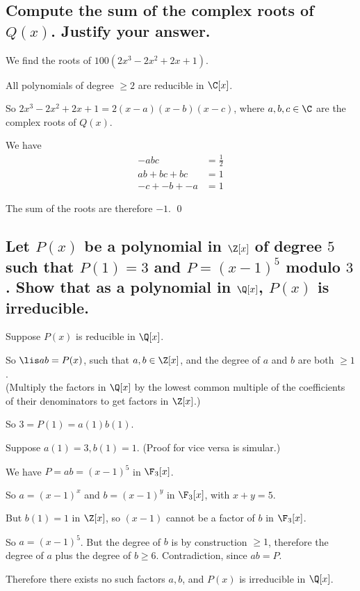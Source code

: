     \subsection[(ii)]{
        Compute the sum of the complex roots of $Q(x)$. Justify your answer.
    }
        We find the roots of $100(2x^3 - 2x^2 + 2x + 1)$.

        All polynomials of degree $\geq 2$ are reducible in $\C[x]$.

        So $2x^3 - 2x^2 + 2x + 1 = 2(x - a)(x-b) ( x-c)$,
        where $a,b,c \in\C$ are the complex roots of $Q(x)$.

        We have 
        \begin{align*}
            -abc &= \frac{1}{2} \\
            ab + bc + bc &= 1 \\
            -c + -b + -a &= 1 
        \end{align*}

        The sum of the roots are therefore $-1$.
        \qed

    \newpage
    \subsection[(iii)]{
        Let $P(x)$ be a polynomial in $\Z[x]$ of degree $5$ such that
        $P(1) = 3$ and $P = (x-1)^5$ modulo $3$. Show that as a polynomial in $\Q[x]$,
        $P(x)$ is irreducible.
    }



        Suppose $P(x)$ is reducible in $\Q[x]$.

        So $ \lis ab = P(x)$, such that $a, b \in \Z[x]$, and the degree of $a$ and $b$ are both $\geq 1$.\\
        (Multiply the factors in $\Q[x]$ by the lowest common multiple of the coefficients of 
        their denominators to get factors in $\Z[x]$.)

        So $3 = P(1) = a(1)b(1)$.

        Suppose $a(1) = 3, b(1) = 1$. 
        (Proof for vice versa is simular.)

        We have $P = ab = (x-1)^5$ in $\F_3[x]$.

        So $a = (x-1)^x$ and $b = (x-1)^y$ in $\F_3[x]$, with $x+y = 5$.

        But $b(1) =1$ in $\Z[x]$, so $(x-1)$ cannot be a factor of $b$ in $\F_3[x]$.

        So $a = (x-1)^5$.
        But the degree of $b$ is by construction $\geq 1$,
        therefore the degree of $a$ plus the degree of $b \geq 6$.
        Contradiction, since $ab = P$.

        Therefore there exists no such factors $a,b$,
        and $P(x)$ is irreducible in $\Q[x]$.
